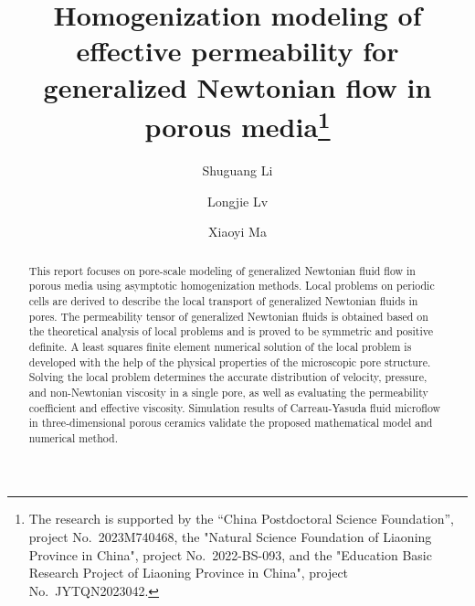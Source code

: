 \documentclass[12pt]{llncs}
\begin{document}
\fi
%
\title{Homogenization modeling of effective permeability for generalized Newtonian flow in porous 
media\thanks{The research is supported by the ``China Postdoctoral Science Foundation'', project No.~2023M740468,
the "Natural Science Foundation of Liaoning Province in China", project No.~2022-BS-093, and
the "Education Basic Research Project of Liaoning Province in China", project No.~JYTQN2023042.}}
\author{Shuguang Li \and Longjie Lv \and Xiaoyi Ma
}

\maketitle

\begin{abstract}
This report focuses on pore-scale modeling of generalized Newtonian fluid flow in porous media using asymptotic homogenization methods.
Local problems on periodic cells are derived to describe the local transport of generalized Newtonian fluids in pores.
The permeability tensor of generalized Newtonian fluids is obtained based on the theoretical analysis of local problems and is proved to be symmetric and positive definite.
A least squares finite element numerical solution of the local problem is developed with the help of the physical properties of the microscopic pore structure.
Solving the local problem determines the accurate distribution of velocity, pressure, and non-Newtonian viscosity in a single pore, as well as evaluating the permeability coefficient and effective viscosity.
Simulation results of Carreau-Yasuda fluid microflow in three-dimensional porous ceramics validate the proposed mathematical model and numerical method.

\end{abstract}

\end{document}
